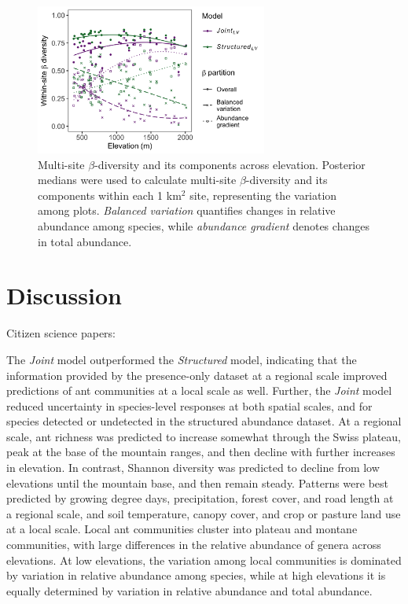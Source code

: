 \documentclass[preprint,review,times,12pt]{elsarticle}
\begin{document}
\begin{figure}
\centering\includegraphics[width=3in]{ms/1_Ecography/1/figs/beta_diversity_LV.png}
\caption{\label{fig:beta_div} Multi-site $\beta$-diversity and its components across elevation. Posterior medians were used to calculate multi-site $\beta$-diversity and its components within each 1 km$^2$ site, representing the variation among plots. \emph{Balanced variation} quantifies changes in relative abundance among species, while \emph{abundance gradient} denotes changes in total abundance.}
\end{figure}


 




\section{Discussion}
\label{S:4}
Citizen science papers: \citep{Altwegg2019, Pernat2020, Henckel2020, Duan2020, Johnston2020,Robinson2020, Beck2010, Poisson2020}

The \emph{Joint} model outperformed the \emph{Structured} model, indicating that the information provided by the presence-only dataset at a regional scale improved predictions of ant communities at a local scale as well. Further, the \emph{Joint} model reduced uncertainty in species-level responses at both spatial scales, and for species detected or undetected in the structured abundance dataset. At a regional scale, ant richness was predicted to increase somewhat through the Swiss plateau, peak at the base of the mountain ranges, and then decline with further increases in elevation. In contrast, Shannon diversity was predicted to decline from low elevations until the mountain base, and then remain steady. Patterns were best predicted by growing degree days, precipitation, forest cover, and road length at a regional scale, and soil temperature, canopy cover, and crop or pasture land use at a local scale. Local ant communities cluster into plateau and montane communities, with large differences in the relative abundance of genera across elevations. At low elevations, the variation among local communities is dominated by variation in relative abundance among species, while at high elevations it is equally determined by variation in relative abundance and total abundance.
\end{document}
